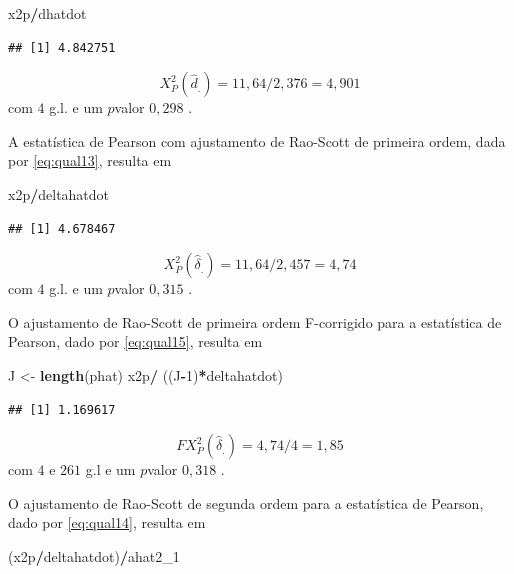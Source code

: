 \documentclass[]{book}
\newenvironment{Shaded}{\begin{snugshade}}{\end{snugshade}}
\newcommand{\KeywordTok}[1]{\textcolor[rgb]{0.13,0.29,0.53}{\textbf{#1}}}
\newcommand{\DecValTok}[1]{\textcolor[rgb]{0.00,0.00,0.81}{#1}}
\newcommand{\StringTok}[1]{\textcolor[rgb]{0.31,0.60,0.02}{#1}}
\newcommand{\OperatorTok}[1]{\textcolor[rgb]{0.81,0.36,0.00}{\textbf{#1}}}
\newcommand{\NormalTok}[1]{#1}
\theoremstyle{definition}
\theoremstyle{definition}
\theoremstyle{definition}
\theoremstyle{remark}
\begin{document}
\begin{Shaded}
\begin{Highlighting}[]
\NormalTok{x2p}\OperatorTok{/}\NormalTok{dhatdot}
\end{Highlighting}
\end{Shaded}

\begin{verbatim}
## [1] 4.842751
\end{verbatim}

\[
X_{P}^{2}\left( \hat{d}_{.}\right) =11,64/2,376=4,901 
\] com \(4\) g.l. e um \(p\)valor \(0,298\) .

A estatística de Pearson com ajustamento de Rao-Scott de primeira ordem,
dada por \eqref{eq:qual13}, resulta em

\begin{Shaded}
\begin{Highlighting}[]
\NormalTok{x2p}\OperatorTok{/}\NormalTok{deltahatdot }
\end{Highlighting}
\end{Shaded}

\begin{verbatim}
## [1] 4.678467
\end{verbatim}

\[
X_{P}^{2}\left( \hat{\delta}_{.}\right) =11,64/2,457=4,74 
\] com \(4\) g.l. e um \(p\)valor \(0,315\) .

O ajustamento de Rao-Scott de primeira ordem F-corrigido para a
estatística de Pearson, dado por \eqref{eq:qual15}, resulta em

\begin{Shaded}
\begin{Highlighting}[]
\NormalTok{J <-}\StringTok{ }\KeywordTok{length}\NormalTok{(phat)}
\NormalTok{x2p}\OperatorTok{/}\StringTok{ }\NormalTok{((J}\OperatorTok{-}\DecValTok{1}\NormalTok{)}\OperatorTok{*}\NormalTok{deltahatdot)}
\end{Highlighting}
\end{Shaded}

\begin{verbatim}
## [1] 1.169617
\end{verbatim}

\[
FX_{P}^{2}\left( \hat{\delta}_{.}\right) =4,74/4=1,85
\] com \(4\) e \(261\) g.l e um \(p\)valor \(0,318\) .

O ajustamento de Rao-Scott de segunda ordem para a estatística de
Pearson, dado por \eqref{eq:qual14}, resulta em

\begin{Shaded}
\begin{Highlighting}[]
\NormalTok{(x2p}\OperatorTok{/}\NormalTok{deltahatdot)}\OperatorTok{/}\NormalTok{ahat2_}\DecValTok{1}
\end{Highlighting}
\end{Shaded}
\end{document}

